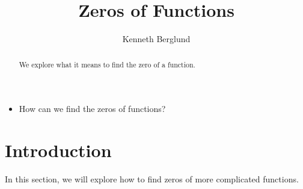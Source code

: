 \documentclass[nooutcomes]{ximera}
\author{Kenneth Berglund}
\title{Zeros of Functions}
\begin{document}
\begin{abstract}
 We explore what it means to find the zero of a function.
\end{abstract}
\maketitle



\begin{motivatingQuestions}\begin{itemize}
\item How can we find the zeros of functions?
\end{itemize}\end{motivatingQuestions}



\section{Introduction}
In this section, we will explore how to find zeros of more complicated functions.  
\end{document}
